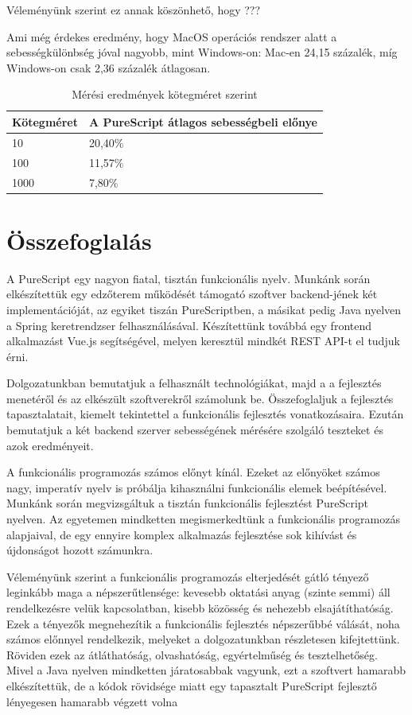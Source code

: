 \documentclass[12pt]{article}
\begin{document}
Véleményünk szerint ez annak köszönhető, hogy ???

Ami még érdekes eredmény, hogy MacOS operációs rendszer alatt a sebességkülönbség jóval nagyobb, mint Windows-on: Mac-en 24,15 százalék, míg Windows-on csak 2,36 százalék átlagosan.

\begin{table}[h!]
\centering
\begin{tabular}{ |p{3.2cm}|p{6cm}| } 
\hline
 \textbf{Kötegméret} &\textbf{A PureScript átlagos sebességbeli előnye}\\
\hline10&20,40\%\\
\hline
100& 11,57\%\\
\hline
1000& 7,80\%\\
\hline
\end{tabular}
\caption{Mérési eredmények kötegméret szerint}
\end{table}


\newpage
\section*{Összefoglalás}

A PureScript egy nagyon fiatal, tisztán funkcionális nyelv. Munkánk során elkészítettük egy edzőterem működését támogató szoftver backend-jének két implementációját, az egyiket tiszán PureScriptben, a másikat pedig Java nyelven a Spring keretrendzser felhasználásával. Készítettünk továbbá egy frontend alkalmazást Vue.js segítségével, melyen keresztül mindkét REST API-t el tudjuk érni. 

Dolgozatunkban bemutatjuk a felhasznált technológiákat, majd a a fejlesztés menetéről és az elkészült szoftverekről számolunk be. Összefoglaljuk a fejlesztés tapasztalatait, kiemelt tekintettel a funkcionális fejlesztés vonatkozásaira.  Ezután bemutatjuk a két backend szerver sebességének mérésére szolgáló teszteket és azok eredményeit.

A funkcionális programozás számos előnyt kínál. Ezeket az előnyöket számos nagy, imperatív nyelv is próbálja kihasználni funkcionális elemek beépítésével. Munkánk során megvizsgáltuk a tisztán funkcionális fejlesztést PureScript nyelven.  Az egyetemen mindketten megismerkedtünk a funkcionális programozás alapjaival, de egy ennyire komplex alkalmazás fejlesztése sok kihívást és újdonságot hozott számunkra. 

Véleményünk szerint a funkcionális programozás elterjedését gátló tényező leginkább maga a népszerűtlensége: kevesebb oktatási anyag (szinte semmi) áll rendelkezésre velük kapcsolatban, kisebb közösség és nehezebb elsajátíthatóság. Ezek a tényezők megnehezítik a funkcionális fejlesztés népszerűbbé válását, noha számos előnnyel rendelkezik, melyeket a dolgozatunkban részletesen kifejtettünk. Röviden ezek az átláthatóság,  olvashatóság, egyértelműség és tesztelhetőség. Mivel a Java nyelven mindketten járatosabbak vagyunk, ezt a szoftvert hamarabb elkészítettük, de a kódok rövidsége miatt egy tapasztalt PureScript fejlesztő lényegesen hamarabb végzett volna
\end{document}
